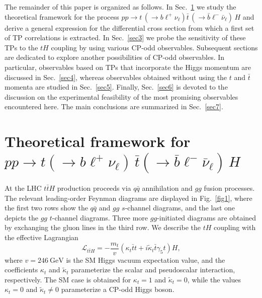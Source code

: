 \documentclass[aps,preprint,tightenlines,floatfix,superscriptaddress,nofootinbib,showpacs]{revtex4-1}
\def\beq{\begin{equation}}
\def\eeq{\end{equation}}
\def\tbar{\bar{t}}
\def\bbar{\bar{b}}
\def\nubar{{\bar{\nu}}_{\ell}}
\def\ppprocess{pp\to t\,\left(\rightarrow b {\ell}^+ \nu_{\ell}\right) \tbar\,\left(\rightarrow\bbar {\ell}^-\nubar\right)\,H}
\def\kp{\kappa_t}
\def\kpt{\tilde{\kappa}_t}
\providecommand{\DIFdelbegin}{} %
\providecommand{\DIFdelend}{} %
\begin{document}
The remainder of this paper is organized as follows. In
Sec.~\ref{sec2} we study the theoretical framework for the process
$\ppprocess$ and derive a general expression for the differential
cross section from which a first set of TP correlations is
extracted. In Sec.~\ref{sec3} we probe the sensitivity of these TPs to
the $tH$ coupling by using various $\mathrm{CP}$-odd
observables. Subsequent sections are dedicated to explore another
possibilities of $\mathrm{CP}$-odd observables. In particular,
observables based on TPs that incorporate the Higgs momentum are
discussed in Sec.~\ref{sec4}, whereas observables obtained without
using the $t$ and $\tbar$ momenta are studied in
Sec.~\ref{sec5}. Finally, Sec.~\ref{sec6} is devoted to the discussion
on the experimental feasibility of the most promising observables
encountered here. The main conclusions are summarized in
Sec.~\ref{sec7}.

\setlength{\abovedisplayskip}{10.6pt}
\setlength{\belowdisplayskip}{10.6pt}
\section{Theoretical framework for \MakeLowercase{{\boldmath $pp\to t(\to b {\ell}^+ \nu_{\ell})\,\bar{t}(\to\bar{b} {\ell}^-\bar{\nu}_{\ell})$}}$\,H$}
\label{sec2}


\DIFdelbegin %

\DIFdelend At the LHC $t\bar{t}H$ production proceeds via $q\bar{q}$
annihilation and $gg$ fusion processes. The relevant leading-order Feynman
diagrams are displayed in Fig.~\ref{fig1}, where the first two
rows show the $q\bar{q}$ and $gg$ $s$-channel diagrams, and
the last one depicts the $gg$ $t$-channel diagrams.  Three more
$gg$-initiated diagrams are obtained by exchanging the gluon
lines in the third row.
We describe the $tH$ coupling with the effective Lagrangian
%
\beq
\label{eq1}
\mathcal{L}_{t\bar{t}H}=-\frac{m_t}{v}(\kp \tbar t+i\kpt \tbar
\gamma_5 t)H,
\eeq
%
where $v=246~\mathrm{GeV}$ is the SM Higgs vacuum
expectation value, and the coefficients $\kp$ and $\kpt$ parameterize 
the scalar and pseudoscalar interaction, respectively. The
SM case is obtained for $\kp=1$ and $\kpt=0$, while the values $\kp=0$
and $\kpt\neq 0$ parameterize a $\mathrm{CP}$-odd Higgs boson.
\end{document}
